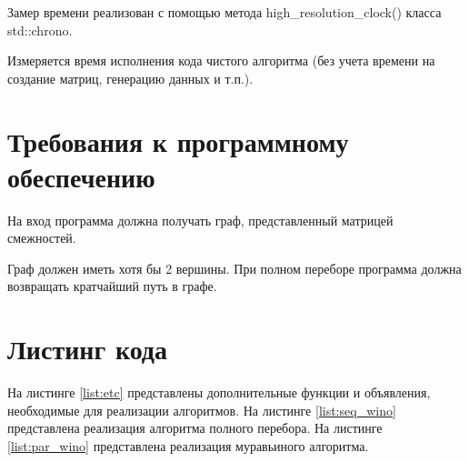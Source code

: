 \documentclass[a4paper,12pt]{report}
\begin{document}
			Замер времени реализован с помощью метода high\_resolution\_clock() класса std::chrono.
			
			Измеряется время исполнения кода чистого алгоритма (без учета времени на создание матриц, генерацию данных и т.п.).\\

	\section{Требования к программному обеспечению}

			На вход программа должна получать граф, представленный матрицей смежностей. 
			
			Граф должен иметь хотя бы 2 вершины. 
			При полном переборе программа должна возвращать кратчайший путь в графе.

	\section{Листинг кода}

        	На листинге \ref{list:etc} представлены дополнительные функции и объявления, необходимые для реализации алгоритмов.
        	На листинге \ref{list:seq_wino} представлена реализация алгоритма полного перебора.
        	На листинге \ref{list:par_wino} представлена реализация муравьиного алгоритма.\\
        	
\end{document}
